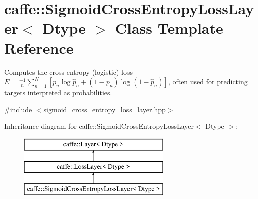 \hypertarget{classcaffe_1_1SigmoidCrossEntropyLossLayer}{}\section{caffe\+:\+:Sigmoid\+Cross\+Entropy\+Loss\+Layer$<$ Dtype $>$ Class Template Reference}
\label{classcaffe_1_1SigmoidCrossEntropyLossLayer}


Computes the cross-\/entropy (logistic) loss $ E = \frac{-1}{n} \sum\limits_{n=1}^N \left[ p_n \log \hat{p}_n + (1 - p_n) \log(1 - \hat{p}_n) \right] $, often used for predicting targets interpreted as probabilities.  




{\ttfamily \#include $<$sigmoid\+\_\+cross\+\_\+entropy\+\_\+loss\+\_\+layer.\+hpp$>$}

Inheritance diagram for caffe\+:\+:Sigmoid\+Cross\+Entropy\+Loss\+Layer$<$ Dtype $>$\+:\begin{figure}[H]
\begin{center}
\leavevmode
\includegraphics[height=3.000000cm]{classcaffe_1_1SigmoidCrossEntropyLossLayer}
\end{center}
\end{figure}
